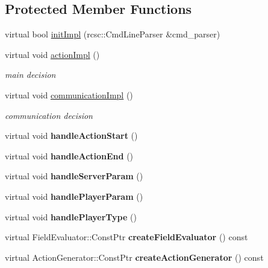 \subsection*{Protected Member Functions}
\begin{DoxyCompactItemize}
\item 
virtual bool \hyperlink{classSamplePlayer_a2764761c9b658612028c2e51804f4ed9}{initImpl} (rcsc::CmdLineParser \&cmd\_\-parser)
\item 
virtual void \hyperlink{classSamplePlayer_aa602ecb23790587f7a45e3dda5a200df}{actionImpl} ()
\begin{DoxyCompactList}\small\item\em main decision \item\end{DoxyCompactList}\item 
virtual void \hyperlink{classSamplePlayer_a1e248b431eb5ff5c991e776519eec6b4}{communicationImpl} ()
\begin{DoxyCompactList}\small\item\em communication decision \item\end{DoxyCompactList}\item 
\hypertarget{classSamplePlayer_a83d7651109b2fb8709f9ff1b51f37d85}{
virtual void {\bfseries handleActionStart} ()}
\label{classSamplePlayer_a83d7651109b2fb8709f9ff1b51f37d85}

\item 
\hypertarget{classSamplePlayer_ab8a11780759523e100f49ac844fe170e}{
virtual void {\bfseries handleActionEnd} ()}
\label{classSamplePlayer_ab8a11780759523e100f49ac844fe170e}

\item 
\hypertarget{classSamplePlayer_a1f64c0a8cd81a17ef49fdfd00378e826}{
virtual void {\bfseries handleServerParam} ()}
\label{classSamplePlayer_a1f64c0a8cd81a17ef49fdfd00378e826}

\item 
\hypertarget{classSamplePlayer_ad0d05ebba2d7192dda839cd651db42d5}{
virtual void {\bfseries handlePlayerParam} ()}
\label{classSamplePlayer_ad0d05ebba2d7192dda839cd651db42d5}

\item 
\hypertarget{classSamplePlayer_a6192a34f71c3ca98f90d114e1f635313}{
virtual void {\bfseries handlePlayerType} ()}
\label{classSamplePlayer_a6192a34f71c3ca98f90d114e1f635313}

\item 
\hypertarget{classSamplePlayer_a66b4fbcd3608ca0f63f7ef5bc352b051}{
virtual FieldEvaluator::ConstPtr {\bfseries createFieldEvaluator} () const }
\label{classSamplePlayer_a66b4fbcd3608ca0f63f7ef5bc352b051}

\item 
\hypertarget{classSamplePlayer_ace191e5a666ede229d32b55e84253222}{
virtual ActionGenerator::ConstPtr {\bfseries createActionGenerator} () const }
\label{classSamplePlayer_ace191e5a666ede229d32b55e84253222}

\end{DoxyCompactItemize}


